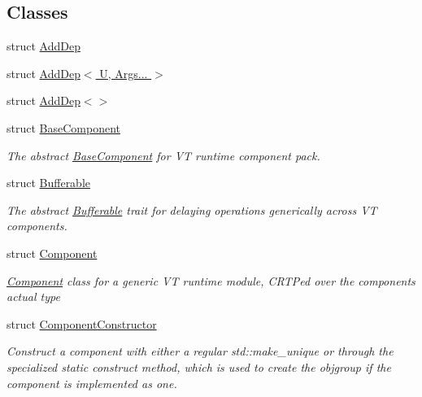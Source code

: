 \subsection*{Classes}
\begin{DoxyCompactItemize}
\item 
struct \hyperlink{structvt_1_1runtime_1_1component_1_1_add_dep}{Add\+Dep}
\item 
struct \hyperlink{structvt_1_1runtime_1_1component_1_1_add_dep_3_01_u_00_01_args_8_8_8_01_4}{Add\+Dep$<$ U, Args... $>$}
\item 
struct \hyperlink{structvt_1_1runtime_1_1component_1_1_add_dep_3_4}{Add\+Dep$<$$>$}
\item 
struct \hyperlink{structvt_1_1runtime_1_1component_1_1_base_component}{Base\+Component}
\begin{DoxyCompactList}\small\item\em The abstract {\ttfamily \hyperlink{structvt_1_1runtime_1_1component_1_1_base_component}{Base\+Component}} for VT runtime component pack. \end{DoxyCompactList}\item 
struct \hyperlink{structvt_1_1runtime_1_1component_1_1_bufferable}{Bufferable}
\begin{DoxyCompactList}\small\item\em The abstract {\ttfamily \hyperlink{structvt_1_1runtime_1_1component_1_1_bufferable}{Bufferable}} trait for delaying operations generically across VT components. \end{DoxyCompactList}\item 
struct \hyperlink{structvt_1_1runtime_1_1component_1_1_component}{Component}
\begin{DoxyCompactList}\small\item\em {\ttfamily \hyperlink{structvt_1_1runtime_1_1component_1_1_component}{Component}} class for a generic VT runtime module, C\+R\+TP\textquotesingle{}ed over the component\textquotesingle{}s actual type \end{DoxyCompactList}\item 
struct \hyperlink{structvt_1_1runtime_1_1component_1_1_component_constructor}{Component\+Constructor}
\begin{DoxyCompactList}\small\item\em Construct a component with either a regular {\ttfamily std\+::make\+\_\+unique} or through the specialized static {\ttfamily construct} method, which is used to create the objgroup if the component is implemented as one. \end{DoxyCompactList}\item 

\end{DoxyCompactItemize}
